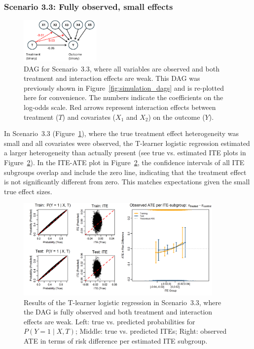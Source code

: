 \clearpage

\subsubsection{Scenario 3.3: Fully observed, small effects} \label{sec:exp3_sc3}

\begin{figure}[htbp]
\centering
\includegraphics[width=0.35\textwidth]{img/results_ITE_simulation/simulation_small_effects.png}
\caption{DAG for Scenario~3.3, where all variables are observed and both treatment and interaction effects are weak. This DAG was previously shown in Figure~\ref{fig:simulation_dags} and is re-plotted here for convenience. The numbers indicate the coefficients on the log-odds scale. Red arrows represent interaction effects between treatment ($T$) and covariates ($X_1$ and $X_2$) on the outcome ($Y$).}
\label{fig:small_interaction_dag}
\end{figure}




In Scenario~3.3 (Figure~\ref{fig:small_interaction_dag}), where the true treatment effect heterogeneity was small and all covariates were observed, the T-learner logistic regression estimated a larger heterogeneity than actually present (see true vs. estimated ITE plots in Figure~\ref{fig:small_interaction_glm_tlearner}). In the ITE-ATE plot in Figure~\ref{fig:small_interaction_glm_tlearner}, the confidence intervals of all ITE subgroups overlap and include the zero line, indicating that the treatment effect is not significantly different from zero. This matches expectations given the small true effect sizes.



\begin{figure}[htbp]
\centering
\includegraphics[width=0.9\textwidth]{img/results_ITE_simulation/small_interaction_glm_tlearner.png}
\caption{Results of the T-learner logistic regression in Scenario~3.3, where the DAG is fully observed and both treatment and interaction effects are weak. Left: true vs. predicted probabilities for $P(Y = 1 \mid X, T)$; Middle: true vs. predicted ITEs; Right: observed ATE in terms of risk difference per estimated ITE subgroup.}
\label{fig:small_interaction_glm_tlearner}
\end{figure}



